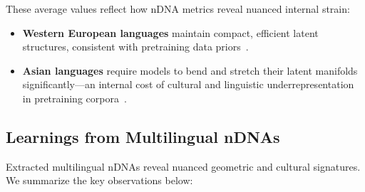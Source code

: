 \noindent
These average values reflect how nDNA metrics reveal nuanced internal strain:
\begin{itemize}[leftmargin=1.5em]
    \item \textbf{Western European languages} maintain compact, efficient latent structures, consistent with pretraining data priors~\citep{mukherjee2020globalizing, sang2022evaluating}.
    \item \textbf{Asian languages} require models to bend and stretch their latent manifolds significantly---an internal cost of cultural and linguistic underrepresentation in pretraining corpora~\citep{blodgett2020language, xiang2024cultural}.
\end{itemize}


\subsection{Learnings from Multilingual nDNAs}
Extracted multilingual nDNAs reveal nuanced geometric and cultural signatures. We summarize the key observations below:


